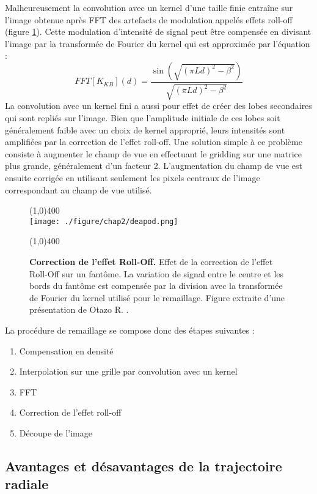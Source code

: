 Malheureusement la convolution avec un kernel d'une taille finie entraîne sur l'image obtenue après FFT des artefacts de modulation appelés effets roll-off (figure \ref{fig:deapod}). Cette modulation d'intensité de signal peut être compensée en divisant l'image par la transformée de Fourier du kernel qui est approximée par l'équation :
\begin{equation}
	FFT[K_{KB}](d) = \frac{\sin(\sqrt{(\pi L d)^2-\beta^2})}{\sqrt{(\pi L d)^2-\beta^2}}
\end{equation}
La convolution avec un kernel fini a aussi pour effet de créer des lobes secondaires qui sont repliés sur l'image.  Bien que l'amplitude initiale de ces lobes soit généralement faible avec un choix de kernel approprié, leurs intensités sont amplifiées par la correction de l'effet roll-off. Une solution simple à ce problème consiste à augmenter le champ de vue en effectuant le gridding sur une matrice plus grande, généralement d'un facteur 2. L'augmentation du champ de vue est ensuite corrigée en utilisant seulement les pixels centraux de l'image correspondant au champ de vue utilisé.

\begin{figure}[H]
\centering
\line(1,0){400} \\
\texttt{[image: ./figure/chap2/deapod.png]}
\caption[ Correction de l'effet Roll-Off.]{\label{fig:deapod}\textbf{ Correction de l'effet Roll-Off.} Effet de la correction de l'effet Roll-Off sur un fantôme. La variation de signal entre le centre et les bords du fantôme est compensée par la division avec la transformée de Fourier du kernel utilisé pour le remaillage. Figure extraite d'une présentation de Otazo R. \cite{otazo:2014Reconstructi} .}
\line(1,0){400} \\
\end{figure}

La procédure de remaillage se compose donc des étapes suivantes :
\begin{enumerate}
\item Compensation en densité
\item Interpolation sur une grille par convolution avec un kernel
\item FFT
\item Correction de l'effet roll-off
\item Découpe de l'image
\end{enumerate}

\subsection{Avantages et désavantages de la trajectoire radiale}

